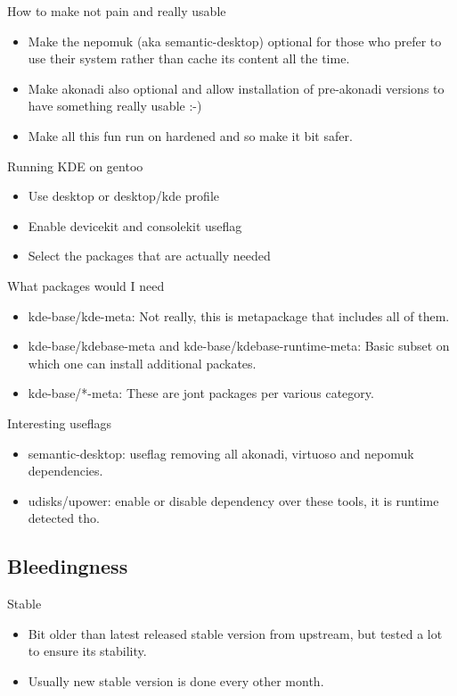 \documentclass{beamer}
\begin{document}
\begin{frame}{How to make not pain and really usable}
	\begin{itemize}
		\item Make the nepomuk (aka semantic-desktop) optional for those who prefer to use their system rather than cache its content all the time.
		\item Make akonadi also optional and allow installation of pre-akonadi versions to have something really usable :-)
		\item Make all this fun run on hardened and so make it bit safer.
	\end{itemize}
\end{frame}

\begin{frame}{Running KDE on gentoo}
	\begin{itemize}
		\item Use desktop or desktop/kde profile
		\item Enable devicekit and consolekit useflag
		\item Select the packages that are actually needed
	\end{itemize}
\end{frame}

\begin{frame}{What packages would I need}
	\begin{itemize}
		\item kde-base/kde-meta: Not really, this is metapackage that includes all of them.
		\item kde-base/kdebase-meta and kde-base/kdebase-runtime-meta: Basic subset on which one can install additional packates.
		\item kde-base/*-meta: These are jont packages per various category.
	\end{itemize}
\end{frame}

\begin{frame}{Interesting useflags}
	\begin{itemize}
		\item semantic-desktop: useflag removing all akonadi, virtuoso and nepomuk dependencies.
		\item udisks/upower: enable or disable dependency over these tools, it is runtime detected tho.
	\end{itemize}
\end{frame}

\subsection{Bleedingness}
\begin{frame}{Stable}
	\begin{itemize}
		\item Bit older than latest released stable version from upstream, but tested a lot to ensure its stability.
		\item Usually new stable version is done every other month.
	\end{itemize}
\end{frame}
\end{document}

